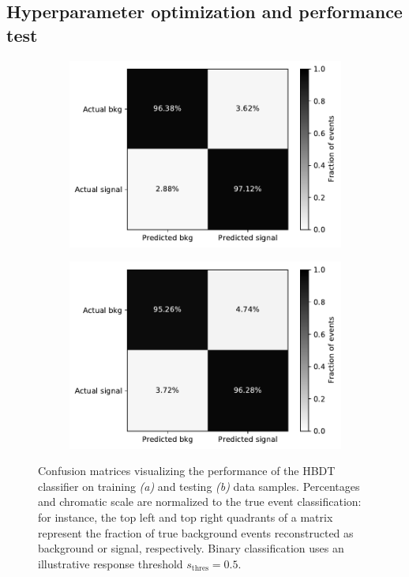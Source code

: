 \subsection{Hyperparameter optimization and performance test}
\begin{figure}[t]
	\centering
	\begin{subfigure}{.45\textwidth}
		\includegraphics[width=\textwidth]{graphics/04-event_selection/confmatrix_train.pdf}
		\caption{}
	\end{subfigure}
	\begin{subfigure}{.45\textwidth}
		\includegraphics[width=\textwidth]{graphics/04-event_selection/confmatrix_test.pdf}
		\caption{}
	\end{subfigure}
	\caption{Confusion matrices visualizing the performance of the HBDT classifier on training \textit{(a)} and testing \textit{(b)} data samples. Percentages and chromatic scale are normalized to the true event classification: for instance, the top left and top right quadrants of a matrix represent the fraction of true background events reconstructed as background or signal, respectively. Binary classification uses an illustrative response threshold $s_\text{thres} = 0.5$.}
\end{figure}


